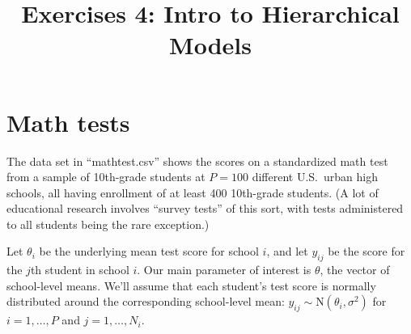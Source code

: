 \documentclass{mynotes}
\title[Exercises 4 $\cdot$ SDS 383D]{Exercises 4: Intro to Hierarchical Models}
\date{}  %
\begin{document}
\maketitle%


\section{Math tests}

The data set in ``mathtest.csv'' shows the scores on a standardized math test from a sample of 10th-grade students at $P=100$ different U.S.~urban high schools, all having enrollment of at least 400 10th-grade students.  (A lot of educational research involves ``survey tests'' of this sort, with tests administered to all students being the rare exception.)

Let $\theta_i$ be the underlying mean test score for school $i$, and let $y_{ij}$ be the score for the $j$th student in school $i$.  Our main parameter of interest is $\theta$, the vector of school-level means.  We'll assume that each student's test score is normally distributed around the corresponding school-level mean: $y_{ij} \sim \mbox{N}(\theta_i, \sigma^2)$ for $i=1, \ldots, P$ and $j = 1, \ldots, N_i$.  
\end{document}
